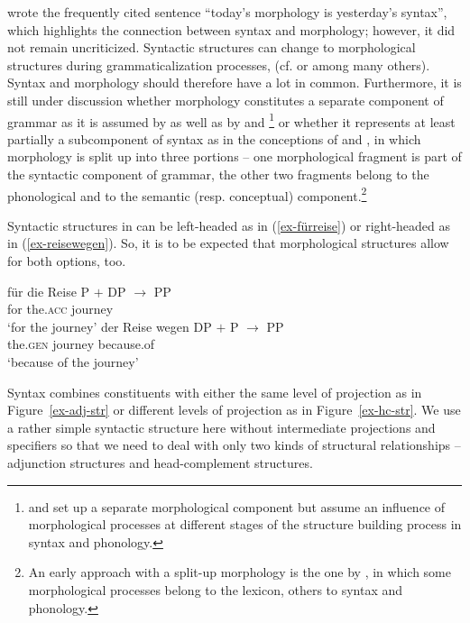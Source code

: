 \documentclass[output=paper
  ,nobabel
  ,draftmode
  ,colorlinks, citecolor=brown
]{langscibook}
\begin{document}
\citet[413]{Givon1971} wrote the frequently cited sentence ``today's morphology is yesterday's syntax'',  which highlights the connection between syntax and morphology; however, it did not remain uncriticized. Syntactic structures can change to morphological structures during grammaticalization processes, (cf. \cite{HopperTraugott1993} or \cite{Lehmann2015} among many others). Syntax and morphology should therefore have a lot in common. Furthermore, it is still under discussion whether morphology constitutes a separate component of grammar as it is assumed by \citet{Sadock1991, Sadock2012} as well as by \citet{Borer1988} and \citet{Spencer1991}\footnote{\citet{Borer1988} and \citet{Spencer1991} set up a separate morphological component but assume an influence of morphological processes at different stages of the structure building process in syntax and phonology.} or whether it represents at least partially a subcomponent of syntax as in the conceptions of \citet{Jackendoff1997} and \citet{AckemaNeeleman2004}, in which morphology is split up into three portions – one morphological fragment is part of the syntactic component of grammar, the other two fragments belong to the phonological and to the semantic (resp. conceptual) component.\footnote{An early approach with a split-up morphology is the one by \citet{ShibataniKageyama1988}, in which some morphological processes belong to the lexicon, others to syntax and phonology.}

Syntactic structures in  can be left-headed as in (\ref{ex-fürreise}) or right-headed as in (\ref{ex-reisewegen}). So, it is to be expected that morphological structures allow for both options, too.

\eal 
\ex\label{ex-fürreise}
\gll für die Reise  \hspace{45pt} P $+$ DP $\rightarrow$ PP\\ for the.\textsc{acc} journey  \\
\glt `for the journey'
\ex\label{ex-reisewegen}
\gll der Reise  wegen\hspace{30pt} DP $+$ P $\rightarrow$ PP\\ the.\textsc{gen}   journey   because.of  \\
\glt `because of the journey'
\zl

\noindent 
Syntax combines constituents with either the same level of projection as in Figure~\ref{ex-adj-str} or different levels of projection as in Figure~\ref{ex-hc-str}. We use a rather simple syntactic structure here without intermediate projections and specifiers so that we need to deal with only two kinds of structural relationships – adjunction structures and head-complement structures.
\end{document}
